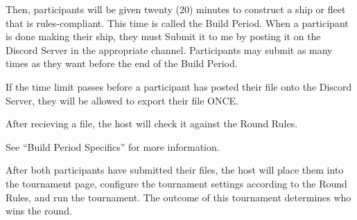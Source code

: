 \documentclass[11pt,letterpaper]{article}
\begin{document}
Then, participants will be given twenty (20) minutes to construct a ship or fleet that is rules-compliant.
This time is called the Build Period.
When a participant is done making their ship, they must Submit it to me by posting it on the 
Discord Server in the appropriate channel. Participants may submit as many times as they want
before the end of the Build Period.

If the time limit passes before a participant has posted their file onto the Discord Server, they 
will be allowed to export their file ONCE.

After recieving a file, the host will check it against the Round Rules.

See ``Build Period Specifics'' for more information.


After both participants have submitted their files, the host will place them into the tournament page, configure the
tournament settings according to the Round Rules, and run the tournament. The outcome of this tournament determines who wins the round.
\end{document}
